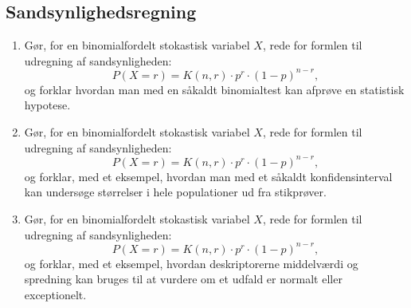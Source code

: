\documentclass[10pt,a4paper]{article}
\begin{document}
\subsection*{Sandsynlighedsregning}
\begin{enumerate}[resume]
\item Gør, for en binomialfordelt stokastisk variabel $X$, rede for formlen til udregning af sandsynligheden:
$$P(X=r)=K(n,r)\cdot p^r\cdot (1-p)^{n-r},$$
og forklar hvordan man med en såkaldt binomialtest kan afprøve en statistisk hypotese.
\item Gør, for en binomialfordelt stokastisk variabel $X$, rede for formlen til udregning af sandsynligheden:
$$P(X=r)=K(n,r)\cdot p^r\cdot (1-p)^{n-r},$$
og forklar, med et eksempel, hvordan man med et såkaldt konfidensinterval kan undersøge størrelser i hele populationer ud fra stikprøver.
\item Gør, for en binomialfordelt stokastisk variabel $X$, rede for formlen til udregning af sandsynligheden:
$$P(X=r)=K(n,r)\cdot p^r\cdot (1-p)^{n-r},$$
og forklar, med et eksempel, hvordan deskriptorerne middelværdi og spredning kan bruges til at vurdere om et udfald er normalt eller exceptionelt.
\end{enumerate}
\end{document}
